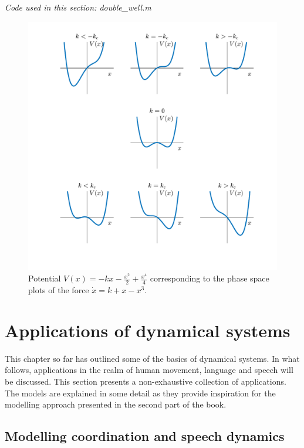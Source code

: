 \medskip\noindent \textit{Code used in this section: double\_well.m}

\begin{figure}[b]
\includegraphics[width=\textwidth]{figures/ch3/double_well_potential.pdf}
\caption{Potential $V(x) = - kx - \frac{x^2}{2} + \frac{x^4}{4}$ corresponding to the phase space plots of the force $\dot{x} = k + x - x^3$.}
\label{fig:double_well_potential}
\end{figure}

\section{Applications of dynamical systems}

This chapter so far has outlined some of the basics of dynamical systems. In what follows, applications in the realm of human movement, language and speech will be discussed. This section presents a non-exhaustive collection of applications. The models are explained in some detail as they provide inspiration for the modelling approach presented in the second part of the book.

\subsection{Modelling coordination and speech dynamics}

